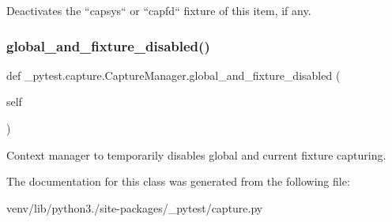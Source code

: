 \begin{DoxyVerb}Deactivates the ``capsys`` or ``capfd`` fixture of this item, if any.\end{DoxyVerb}
 \mbox{\label{class__pytest_1_1capture_1_1_capture_manager_a1bb71cc90eb3ea8b1ff90fac014a3451}} 
\subsubsection{\texorpdfstring{global\+\_\+and\+\_\+fixture\+\_\+disabled()}{global\_and\_fixture\_disabled()}}
{\footnotesize\ttfamily def \+\_\+pytest.\+capture.\+Capture\+Manager.\+global\+\_\+and\+\_\+fixture\+\_\+disabled (\begin{DoxyParamCaption}\item[{}]{self }\end{DoxyParamCaption})}

\begin{DoxyVerb}Context manager to temporarily disables global and current fixture capturing.\end{DoxyVerb}
 

The documentation for this class was generated from the following file\+:\begin{DoxyCompactItemize}
\item 
venv/lib/python3./site-\/packages/\+\_\+pytest/capture.\+py\end{DoxyCompactItemize}
